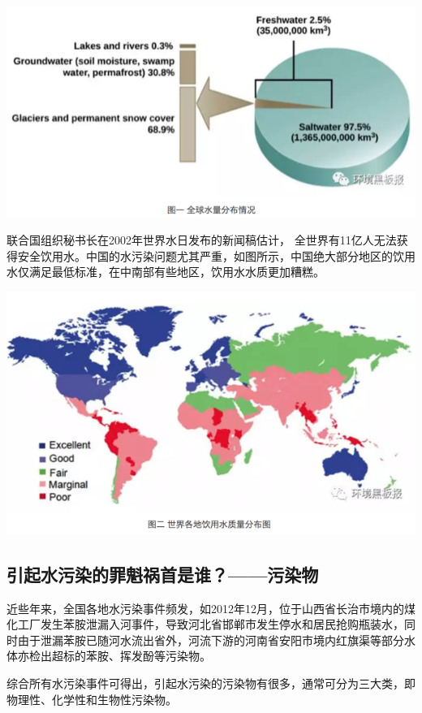 \documentclass[
]{book}
\begin{document}
\includegraphics[width=8.33in]{images/dushui1}

联合国组织秘书长在2002年世界水日发布的新闻稿估计， 全世界有11亿人无法获得安全饮用水。中国的水污染问题尤其严重，如图所示，中国绝大部分地区的饮用水仅满足最低标准，在中南部有些地区，饮用水水质更加糟糕。

\includegraphics[width=8.33in]{images/dushui2}

\hypertarget{ux5f15ux8d77ux6c34ux6c61ux67d3ux7684ux7f6aux9b41ux7978ux9996ux662fux8c01ux6c61ux67d3ux7269}{%
\subsection{引起水污染的罪魁祸首是谁？------污染物}\label{ux5f15ux8d77ux6c34ux6c61ux67d3ux7684ux7f6aux9b41ux7978ux9996ux662fux8c01ux6c61ux67d3ux7269}}

近些年来，全国各地水污染事件频发，如2012年12月，位于山西省长治市境内的煤化工厂发生苯胺泄漏入河事件，导致河北省邯郸市发生停水和居民抢购瓶装水，同时由于泄漏苯胺已随河水流出省外，河流下游的河南省安阳市境内红旗渠等部分水体亦检出超标的苯胺、挥发酚等污染物。

综合所有水污染事件可得出，引起水污染的污染物有很多，通常可分为三大类，即物理性、化学性和生物性污染物。
\end{document}
